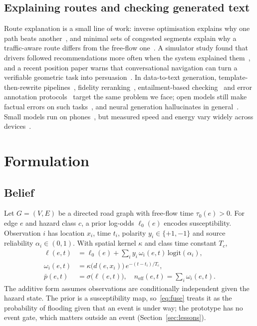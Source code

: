 \documentclass[conference]{IEEEtran}
\begin{document}
\subsection{Explaining routes and checking generated text}
Route explanation is a small line of work: inverse optimisation explains why one path beats another~\cite{alsheeb2023explainable}, and minimal sets of congested segments explain why a traffic-aware route differs from the free-flow one~\cite{schild2025route}. A simulator study found that drivers followed recommendations more often when the system explained them~\cite{thill2018adherence}, and a recent position paper warns that conversational navigation can turn a verifiable geometric task into persuasion~\cite{ilyankou2026scenic}. In data-to-text generation, template-then-rewrite pipelines~\cite{kale2020t2g2}, fidelity reranking~\cite{harkous2020datatuner}, entailment-based checking~\cite{dusek2020nli} and error annotation protocols~\cite{thomson2020gold} target the same problem we face; open models still make factual errors on such tasks~\cite{kasner2024quintd}, and neural generation hallucinates in general~\cite{ji2023hallucination}. Small models run on phones~\cite{gemma2025gemma3}, but measured speed and energy vary widely across devices~\cite{xiao2024pockets,laskaridis2024melt}.

\section{Formulation}\label{sec:model}
\subsection{Belief}
Let $G=(V,E)$ be a directed road graph with free-flow time $\tau_0(e)>0$. For edge $e$ and hazard class $c$, a prior log-odds $\ell_0(e)$ encodes susceptibility. Observation $i$ has location $x_i$, time $t_i$, polarity $y_i\in\{+1,-1\}$ and source reliability $\alpha_i\in(0,1)$. With spatial kernel $\kappa$ and class time constant $T_c$,
\begin{align}
\ell(e,t) &= \ell_0(e) + \textstyle\sum_i y_i\,\omega_i(e,t)\,\mathrm{logit}(\alpha_i), \label{eq:fuse}\\
\omega_i(e,t) &= \kappa\big(d(e,x_i)\big)\,e^{-(t-t_i)/T_c}, \nonumber\\
\bar p(e,t) &= \sigma\big(\ell(e,t)\big), \quad n_{\mathrm{eff}}(e,t)=\textstyle\sum_i \omega_i(e,t). \label{eq:neff}
\end{align}
The additive form assumes observations are conditionally independent given the hazard state. The prior is a susceptibility map, so~\eqref{eq:fuse} treats it as the probability of flooding given that an event is under way; the prototype has no event gate, which matters outside an event (Section~\ref{sec:lessons}).
\end{document}
